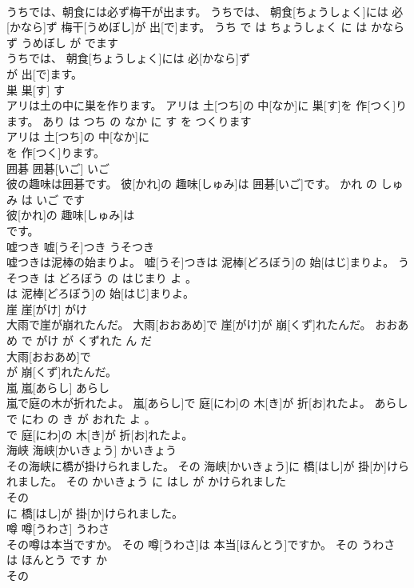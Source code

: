 \documentclass[8pt]{extreport}
\begin{document}
\begin{CJK}{UTF8}{min}
\\	うちでは、朝食には必ず梅干が出ます。	うちでは、 朝食[ちょうしょく]には 必[かなら]ず 梅干[うめぼし]が 出[で]ます。	うち で は ちょうしょく に は かならず うめぼし が でます	
\\	うちでは、 朝食[ちょうしょく]には 必[かなら]ず
\\	が 出[で]ます。			
\\	巣	巣[す]	す	
\\	アリは土の中に巣を作ります。	アリは 土[つち]の 中[なか]に 巣[す]を 作[つく]ります。	あり は つち の なか に す を つくります	
\\	アリは 土[つち]の 中[なか]に
\\	を 作[つく]ります。			
\\	囲碁	囲碁[いご]	いご	
\\	彼の趣味は囲碁です。	彼[かれ]の 趣味[しゅみ]は 囲碁[いご]です。	かれ の しゅみ は いご です	
\\	彼[かれ]の 趣味[しゅみ]は
\\	です。			
\\	嘘つき	嘘[うそ]つき	うそつき	
\\	嘘つきは泥棒の始まりよ。	嘘[うそ]つきは 泥棒[どろぼう]の 始[はじ]まりよ。	うそつき は どろぼう の はじまり よ 。	
\\	は 泥棒[どろぼう]の 始[はじ]まりよ。			
\\	崖	崖[がけ]	がけ	
\\	大雨で崖が崩れたんだ。	大雨[おおあめ]で 崖[がけ]が 崩[くず]れたんだ。	おおあめ で がけ が くずれた ん だ	
\\	大雨[おおあめ]で
\\	が 崩[くず]れたんだ。			
\\	嵐	嵐[あらし]	あらし	
\\	嵐で庭の木が折れたよ。	嵐[あらし]で 庭[にわ]の 木[き]が 折[お]れたよ。	あらし で にわ の き が おれた よ 。	
\\	で 庭[にわ]の 木[き]が 折[お]れたよ。			
\\	海峡	海峡[かいきょう]	かいきょう	
\\	その海峡に橋が掛けられました。	その 海峡[かいきょう]に 橋[はし]が 掛[か]けられました。	その かいきょう に はし が かけられました	
\\	その
\\	に 橋[はし]が 掛[か]けられました。			
\\	噂	噂[うわさ]	うわさ	
\\	その噂は本当ですか。	その 噂[うわさ]は 本当[ほんとう]ですか。	その うわさ は ほんとう です か	
\\	その

\end{CJK}
\end{document}
